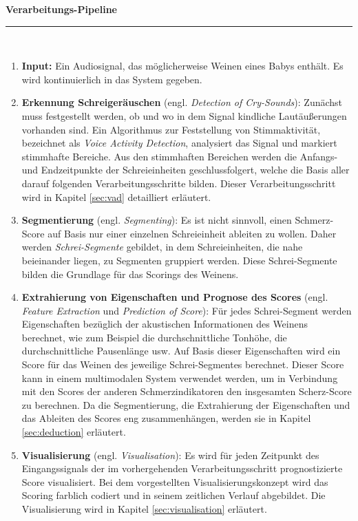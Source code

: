 \noindent\textbf{Verarbeitungs-Pipeline}\noindent\rule{0.8\linewidth}{0.3pt} \\[-3mm]
\begin{enumerate}[leftmargin=*]
	\item \textbf{Input: } Ein Audiosignal, das möglicherweise Weinen eines Babys enthält. Es wird kontinuierlich in das System gegeben.
	
	\item \textbf{Erkennung Schreigeräuschen} (engl. \emph{Detection of Cry-Sounds}): Zunächst muss festgestellt werden, ob und wo in dem Signal kindliche Lautäußerungen vorhanden sind. Ein Algorithmus zur Feststellung von Stimmaktivität, bezeichnet als \emph{Voice Activity Detection}, analysiert das Signal und markiert stimmhafte Bereiche. Aus den stimmhaften Bereichen werden die Anfangs- und Endzeitpunkte der Schreieinheiten geschlussfolgert, welche die Basis aller darauf folgenden Verarbeitungsschritte bilden. Dieser Verarbeitungsschritt wird in Kapitel \ref{sec:vad} detailliert erläutert.
	
	\item \textbf{Segmentierung} (engl. \emph{Segmenting}): Es ist nicht sinnvoll, einen Schmerz-Score auf Basis nur einer einzelnen Schreieinheit ableiten zu wollen. Daher werden \emph{Schrei-Segmente} gebildet, in dem Schreieinheiten, die nahe beieinander liegen, zu Segmenten gruppiert werden. Diese Schrei-Segmente bilden die Grundlage für das Scorings des Weinens. 
		
	\item \textbf{Extrahierung von Eigenschaften und Prognose des Scores} (engl. \emph{Feature Extraction} und \emph{Prediction of Score}): Für jedes Schrei-Segment werden Eigenschaften bezüglich der akustischen Informationen des Weinens berechnet, wie zum Beispiel die durchschnittliche Tonhöhe, die durchschnittliche Pausenlänge usw. Auf Basis dieser Eigenschaften wird ein Score für das Weinen des jeweilige Schrei-Segmentes berechnet. Dieser Score kann in einem multimodalen System verwendet werden, um in Verbindung mit den Scores der anderen Schmerzindikatoren den insgesamten Scherz-Score zu berechnen. Da die Segmentierung, die Extrahierung der Eigenschaften und das Ableiten des Scores eng zusammenhängen, werden sie in Kapitel \ref{sec:deduction} erläutert.
	
	\item \textbf{Visualisierung} (engl. \emph{Visualisation}): Es wird für jeden Zeitpunkt des Eingangssignals der im vorhergehenden Verarbeitungsschritt prognostizierte Score visualisiert. Bei dem vorgestellten Visualisierungskonzept wird das Scoring farblich codiert und in seinem zeitlichen Verlauf abgebildet. Die Visualisierung wird in Kapitel \ref{sec:visualisation} erläutert.	
	\end{enumerate}
	
